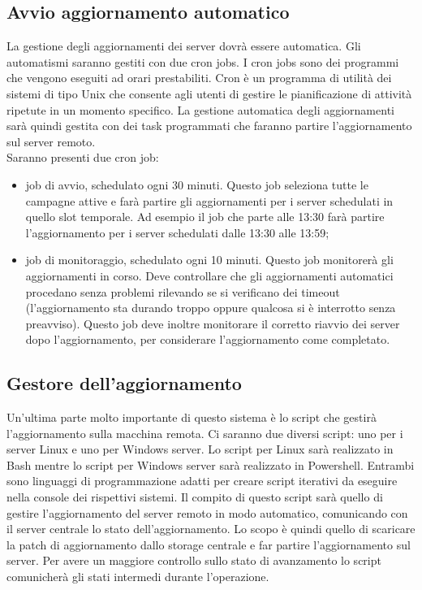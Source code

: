 \subsection{Avvio aggiornamento automatico}
La gestione degli aggiornamenti dei server dovrà essere automatica. 
Gli automatismi saranno gestiti con due cron jobs. I cron jobs sono 
dei programmi che vengono eseguiti ad orari prestabiliti. Cron è un programma di
utilità dei sistemi di tipo Unix che consente agli utenti di gestire 
le pianificazione di attività ripetute in un momento specifico.
La gestione automatica degli aggiornamenti sarà quindi gestita con 
dei task programmati che faranno partire l’aggiornamento sul server remoto.\\

Saranno presenti due cron job:
\begin{itemize}
\item job di avvio, schedulato ogni 30 minuti. Questo job seleziona tutte 
le campagne attive e farà partire gli aggiornamenti per i server schedulati 
in quello slot temporale. Ad esempio il job che parte alle 13:30 farà 
partire l’aggiornamento per i server schedulati dalle 13:30 alle 13:59; 
\item job di monitoraggio, schedulato ogni 10 minuti. Questo job monitorerà gli 
aggiornamenti in corso. Deve controllare che gli aggiornamenti automatici
procedano senza problemi rilevando se si verificano dei timeout 
(l’aggiornamento sta durando troppo oppure qualcosa si è interrotto 
senza preavviso). Questo job deve inoltre monitorare il corretto riavvio 
dei server dopo l’aggiornamento, per considerare l’aggiornamento 
come completato.
\end{itemize}


\subsection{Gestore dell’aggiornamento}
Un’ultima parte molto importante di questo sistema è lo script che gestirà 
l’aggiornamento sulla macchina remota. Ci saranno due diversi script: 
uno per i server Linux e uno per Windows server.
Lo script per Linux sarà realizzato in Bash mentre lo script per Windows 
server sarà realizzato in Powershell. Entrambi sono linguaggi di 
programmazione adatti per creare script iterativi da eseguire nella 
console dei rispettivi sistemi.
Il compito di questo script sarà quello di gestire l'aggiornamento del 
server remoto in modo automatico, comunicando con il server centrale lo 
stato dell’aggiornamento.
Lo scopo è quindi quello di scaricare la patch di aggiornamento dallo 
storage centrale e far partire l’aggiornamento sul server.
Per avere un maggiore controllo sullo stato di avanzamento lo script 
comunicherà gli stati intermedi durante l’operazione.\\

